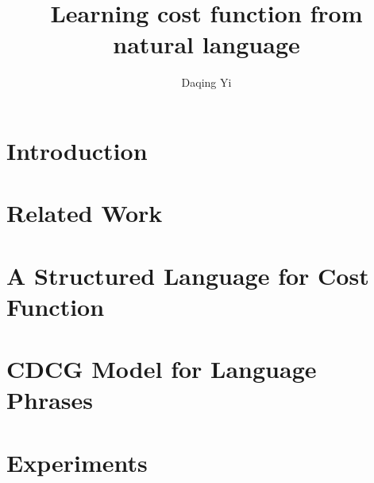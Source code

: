 \documentclass[10pt,a4paper]{article}
\begin{document}
\title{Learning cost function from natural language}	
\author{Daqing Yi}
\date{}
\maketitle

\section{Introduction}

\section{Related Work}

\section{A Structured Language for Cost Function}


\section{CDCG Model for Language Phrases}



\section{Experiments}

 	

	
\end{document}
